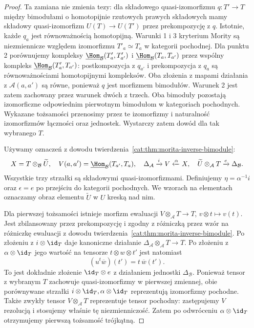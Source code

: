 \begin{proof}
Ta zamiana nie zmienia tezy: dla składowego quasi-izomorfizmu $q:T'\to T$ między bimodułami o homotopijnie rzutowych prawych składowych mamy składowy quasi-izomorfizm $U(T)\to U(T')$ przez prekompozycję z $q$. Istotnie, każde $q_a$ jest równoważnością homotopijną. Warunki 1 i 3 kryterium Mority są niezmiennicze względem izomorfizmu $T'_a\simeq T_a$ w kategorii pochodnej. Dla punktu 2 porównujemy kompleksy $\underline{\Hom}_{\mathcal B}(T'_a,T'_{a'})$ i $\underline{\Hom}_{\mathcal B}(T_a,T_{a'})$ przez wspólny kompleks $\underline{\Hom}_{\mathcal B}(T'_a,T_{a'})$: postkompozycja z $q_{a'}$ i prekompozycja z $q_a$ są równoważnościami homotopijnymi kompleksów. Oba złożenia z mapami działania z $\mathcal A(a,a')$ są równe, ponieważ $q$ jest morfizmem bimodułów. Warunek 2 jest zatem zachowany przez warunek dwóch z trzech. Oba bimoduły pozostają izomorficzne odpowiednim pierwotnym bimodułom w kategoriach pochodnych. Wykazane tożsamości przenosimy przez te izomorfizmy i naturalność izomorfizmów łączności oraz jednostek. Wystarczy zatem dowód dla tak wybranego $T$.

Używamy oznaczeń z dowodu twierdzenia~\ref{cat:thm:morita-inverse-bimodule}:
\[
 X=T\otimes_{\mathcal B}\widetilde U,\quad
 V(a,a')=\underline{\Hom}_{\mathcal B}(T_{a'},T_a),\quad
 \Delta_{\mathcal A}\xrightarrow{i}V\xleftarrow{\alpha}X,\quad
 \widetilde U\otimes_{\mathcal A}T\xrightarrow{e}\Delta_{\mathcal B}.
\]
Wszystkie trzy strzałki są składowymi quasi-izomorfizmami. Definiujemy $\eta=\alpha^{-1}i$ oraz $\epsilon=e$ po przejściu do kategorii pochodnych. We wzorach na elementach oznaczamy obraz elementu $\widetilde U$ w $U$ kreską nad nim.

Dla pierwszej tożsamości istnieje morfizm ewaluacji $V\otimes_{\mathcal A}T\to T$, $v\otimes t\mapsto v(t)$. Jest zbilansowany przez prekompozycję i zgodny z różniczką przez wzór na różniczkę ewaluacji z dowodu twierdzenia~\ref{cat:thm:morita-inverse-bimodule}. Po złożeniu z $i\otimes\id_T$ daje kanoniczne działanie $\Delta_{\mathcal A}\otimes_{\mathcal A}T\to T$. Po złożeniu z $\alpha\otimes\id_T$ jego wartość na tensorze $t\otimes w\otimes t'$ jest natomiast
\[
 (u^t\overline w)(t')=t\,\overline w(t').
\]
To jest dokładnie złożenie $\id_T\otimes e$ z działaniem jednostki $\Delta_{\mathcal B}$. Ponieważ tensor z wybranym $T$ zachowuje quasi-izomorfizmy w pierwszej zmiennej, obie porównywane strzałki $i\otimes\id_T,\alpha\otimes\id_T$ reprezentują izomorfizmy pochodne. Także zwykły tensor $V\otimes_{\mathcal A}T$ reprezentuje tensor pochodny: zastępujemy $V$ rezolucją i stosujemy właśnie tę niezmienniczość. Zatem po odwróceniu $\alpha\otimes\id_T$ otrzymujemy pierwszą tożsamość trójkątną.


\end{proof}

